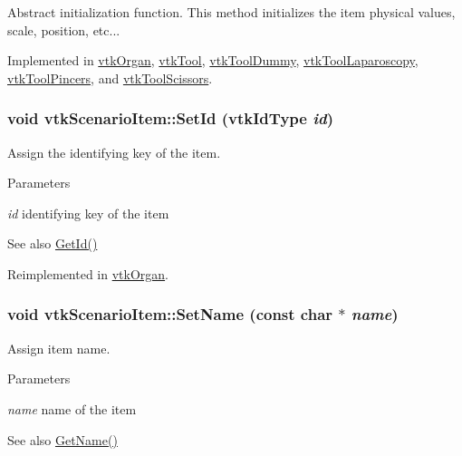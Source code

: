 Abstract initialization function. This method initializes the item physical values, scale, position, etc... 

Implemented in \hyperlink{classvtkOrgan_a48aa20d7255903b3f7ac5cd2a4adec8c}{vtkOrgan}, \hyperlink{classvtkTool_a6b9e7743cde1b61b252abef17248a913}{vtkTool}, \hyperlink{classvtkToolDummy_aaf4c69a9c0fc3432e678ca9fffc913dc}{vtkToolDummy}, \hyperlink{classvtkToolLaparoscopy_ace75ea21a3ddb27547976ddea0ebb60e}{vtkToolLaparoscopy}, \hyperlink{classvtkToolPincers_ae4918610073324c94dddd8da234742a9}{vtkToolPincers}, and \hyperlink{classvtkToolScissors_a5fc5884ce0fd1723ecf86888bdbba7a6}{vtkToolScissors}.\hypertarget{classvtkScenarioItem_afd99a6db7187837d0129e9898478ec60}{
\subsubsection[{SetId}]{\setlength{\rightskip}{0pt plus 5cm}void vtkScenarioItem::SetId (vtkIdType {\em id})}}
\label{classvtkScenarioItem_afd99a6db7187837d0129e9898478ec60}


Assign the identifying key of the item. 
\begin{DoxyParams}{Parameters}
\item[{\em id}]identifying key of the item \end{DoxyParams}
\begin{DoxySeeAlso}{See also}
\hyperlink{classvtkScenarioItem_a9884061bd42ee058291d95a67ddcac20}{GetId()} 
\end{DoxySeeAlso}


Reimplemented in \hyperlink{classvtkOrgan_a0aab831b4e0a9d33ba961a0907b73e80}{vtkOrgan}.\hypertarget{classvtkScenarioItem_a199f87511e99386bb9f271d91c2d0caf}{
\subsubsection[{SetName}]{\setlength{\rightskip}{0pt plus 5cm}void vtkScenarioItem::SetName (const char $\ast$ {\em name})}}
\label{classvtkScenarioItem_a199f87511e99386bb9f271d91c2d0caf}


Assign item name. 
\begin{DoxyParams}{Parameters}
\item[{\em name}]name of the item \end{DoxyParams}
\begin{DoxySeeAlso}{See also}
\hyperlink{classvtkScenarioItem_a41ebb204b2879d9dd14a392c1cb3c2fe}{GetName()} 
\end{DoxySeeAlso}


